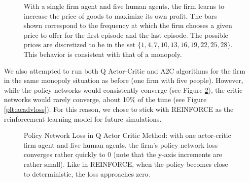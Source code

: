 \documentclass[twoside,twocolumn]{article}
\begin{document}
\begin{figure}[h]
  \caption{With a single firm agent and five human agents, the firm learns to increase the price of goods to maximize its own profit. The bars shown correspond to the frequency at which the firm chooses a given price to offer for the first episode and the last episode. The possible prices are discretized to be in the set $\{1, 4, 7, 10, 13, 16, 19, 22, 25, 28\}$. This behavior is consistent with that of a monopoly.}
  \label{plt:firmactions}
\end{figure}

We also attempted to run both Q Actor-Critic and A2C algorithms for the firm in the same monopoly situation as before (one firm with five people). However, while the policy networks would consistently converge (see Figure \ref{plt:acpolicyloss}), the critic networks would rarely converge, about 10\% of the time (see Figure \ref{plt:acadvloss}). For this reason, we chose to stick with REINFORCE as the reinforcement learning model for future simulations.

\begin{figure}[h]
\caption{Policy Network Loss in Q Actor Critic Method: with one actor-critic firm agent and five human agents, the firm's policy network loss converges rather quickly to 0 (note that the y-axis increments are rather small). Like in REINFORCE, when the policy becomes close to deterministic, the loss approaches zero.}
\label{plt:acpolicyloss}
\end{figure}
\end{document}
